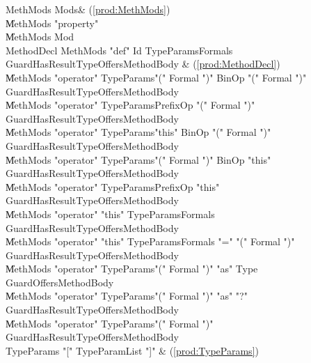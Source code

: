 \begin{bbgrammar}
            MethMods \: Mods\opt & (\ref{prod:MethMods}) \\
                     \| MethMods \xcd"property"  \\
                     \| MethMods Mod \\
          MethodDecl \: MethMods \xcd"def" Id TypeParams\opt Formals Guard\opt HasResultType\opt Offers\opt MethodBody & (\ref{prod:MethodDecl}) \\
                     \| MethMods \xcd"operator" TypeParams\opt \xcd"(" Formal  \xcd")" BinOp \xcd"(" Formal  \xcd")" Guard\opt HasResultType\opt Offers\opt MethodBody \\
                     \| MethMods \xcd"operator" TypeParams\opt PrefixOp \xcd"(" Formal  \xcd")" Guard\opt HasResultType\opt Offers\opt MethodBody \\
                     \| MethMods \xcd"operator" TypeParams\opt \xcd"this" BinOp \xcd"(" Formal  \xcd")" Guard\opt HasResultType\opt Offers\opt MethodBody \\
                     \| MethMods \xcd"operator" TypeParams\opt \xcd"(" Formal  \xcd")" BinOp \xcd"this" Guard\opt HasResultType\opt Offers\opt MethodBody \\
                     \| MethMods \xcd"operator" TypeParams\opt PrefixOp \xcd"this" Guard\opt HasResultType\opt Offers\opt MethodBody \\
                     \| MethMods \xcd"operator" \xcd"this" TypeParams\opt Formals Guard\opt HasResultType\opt Offers\opt MethodBody \\
                     \| MethMods \xcd"operator" \xcd"this" TypeParams\opt Formals \xcd"=" \xcd"(" Formal  \xcd")" Guard\opt HasResultType\opt Offers\opt MethodBody \\
                     \| MethMods \xcd"operator" TypeParams\opt \xcd"(" Formal  \xcd")" \xcd"as" Type Guard\opt Offers\opt MethodBody \\
                     \| MethMods \xcd"operator" TypeParams\opt \xcd"(" Formal  \xcd")" \xcd"as" \xcd"?" Guard\opt HasResultType\opt Offers\opt MethodBody \\
                     \| MethMods \xcd"operator" TypeParams\opt \xcd"(" Formal  \xcd")" Guard\opt HasResultType\opt Offers\opt MethodBody \\
          TypeParams \: \xcd"[" TypeParamList \xcd"]" & (\ref{prod:TypeParams}) \\

\end{bbgrammar}
